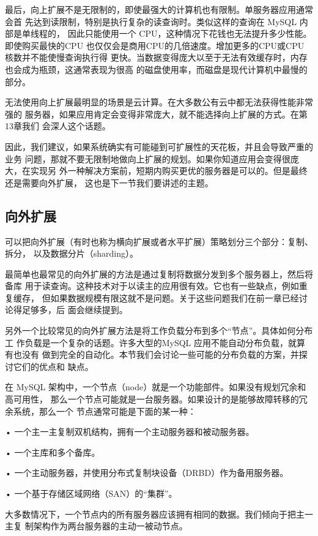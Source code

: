 最后，向上扩展不是无限制的，即使最强大的计算机也有限制。单服务器应用通常会首
先达到读限制，特别是执行复杂的读查询时。类似这样的查询在 MySQL 内部是单线程的，
因此只能使用一个 CPU，这种情况下花钱也无法提升多少性能。即使购买最快的CPU
也仅仅会是商用CPU的几倍速度。增加更多的CPU或CPU 核数并不能使慢查询执行得
更快。当数据变得庞大以至于无法有效缓存时，内存也会成为瓶颈，这通常表现为很高
的磁盘使用率，而磁盘是现代计算机中最慢的部分。

无法使用向上扩展最明显的场景是云计算。在大多数公有云中都无法获得性能非常强的
服务器，如果应用肯定会变得非常庞大，就不能选择向上扩展的方式。在第13章我们
会深人这个话题。

因此，我们建议，如果系统确实有可能碰到可扩展性的天花板，并且会导致严重的业务
问题，那就不要无限制地做向上扩展的规划。如果你知道应用会变得很庞大，在实现另
外一种解决方案前，短期内购买更优的服务器是可以的。但是最终还是需要向外扩展，
这也是下一节我们要讲述的主题。

\subsection{向外扩展}
可以把向外扩展（有时也称为横向扩展或者水平扩展）策略划分三个部分：复制、拆分，
以及数据分片（sharding）。

最简单也最常见的向外扩展的方法是通过复制将数据分发到多个服务器上，然后将备库
用于读查询。这种技术对于以读主的应用很有效。它也有一些缺点，例如重复缓存，
但如果数据规模有限这就不是问题。关于这些问题我们在前一章已经讨论得足够多，后
面会继续提到。

另外一个比较常见的向外扩展方法是将工作负载分布到多个“节点”。具体如何分布工
作负载是一个复杂的话题。许多大型的MySQL 应用不能自动分布负载，就算有也没有
做到完全的自动化。本节我们会讨论一些可能的分布负载的方案，并探讨它们的优点和
缺点。

在 MySQL 架构中，一个节点（node）就是一个功能部件。如果没有规划冗余和高可用性，
那么一个节点可能就是一台服务器。如果设计的是能够故障转移的冗余系统，那么一个
节点通常可能是下面的某一种：

• 一个主一主复制双机结构，拥有一个主动服务器和被动服务器。

• 一个主库和多个备库。

• 一个主动服务器，并使用分布式复制块设备（DRBD）作为备用服务器。

• 一个基于存储区域网络（SAN）的“集群”。

大多数情况下，一个节点内的所有服务器应该拥有相同的数据。我们倾向于把主一主复
制架构作为两台服务器的主动一被动节点。

